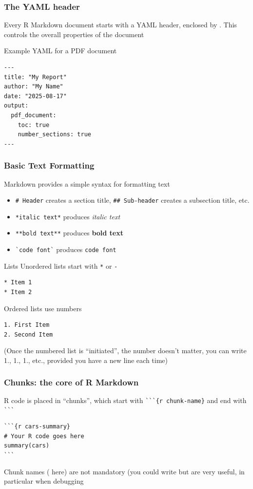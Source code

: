 \documentclass[aspectratio=169]{beamer}\usepackage[]{graphicx}\usepackage[]{xcolor}
\begin{document}
\begin{frame}[fragile]
  \frametitle{The YAML header}
Every R Markdown document starts with a YAML header, enclosed by \code{---}. This controls the overall properties of the document
\begin{block}{Example YAML for a PDF document}
\begin{verbatim}
---
title: "My Report"
author: "My Name"
date: "2025-08-17"
output:
  pdf_document:
    toc: true
    number_sections: true
---
\end{verbatim}
\end{block}
\end{frame}

\begin{frame}[fragile]
  \frametitle{Basic Text Formatting}
  Markdown provides a simple syntax for formatting text
  \vfill
  \begin{itemize}
    \item \verb|# Header| creates a section title, \verb|## Sub-header| creates a subsection title, etc.
    \vfill
    \item \verb|*italic text*| produces \textit{italic text}
    \vfill
    \item \verb|**bold text**| produces \textbf{bold text}
    \vfill
    \item \verb|`code font`| produces \texttt{code font}
  \end{itemize}
\end{frame}

\begin{frame}[fragile]{Lists}
Unordered lists start with \verb|*| or \verb|-|
\begin{verbatim}
* Item 1
* Item 2
\end{verbatim}
\vfill
Ordered lists use numbers
\begin{verbatim}
1. First Item
2. Second Item
\end{verbatim}
\vfill
(Once the numbered list is ``initiated'', the number doesn't matter, you can write 1., 1., 1., etc., provided you have a new line each time)
\end{frame}

\begin{frame}[fragile]
  \frametitle{Chunks: the core of R Markdown}
  R code is placed in ``chunks'', which start with \verb|```{r chunk-name}| and end with \verb|```|
\begin{lstlisting}
```{r cars-summary}
# Your R code goes here
summary(cars)
```
\end{lstlisting}
\vfill
Chunk names ( here) are not mandatory (you could write  but are very useful, in particular when debugging
\end{frame}
\end{document}
